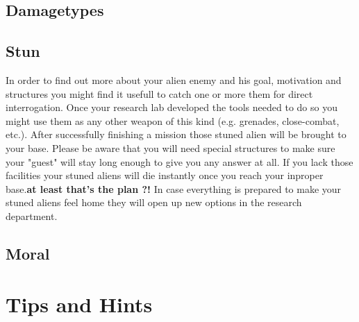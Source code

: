 \subsection{Damagetypes}

\subsection{Stun}
In order to find out more about your alien enemy and his goal, motivation and structures you might find it usefull to catch one or more them for direct interrogation. Once your research lab developed the tools needed to do so you might use them as any other weapon of this kind (e.g. grenades, close-combat, etc.). After successfully finishing a mission those stuned alien will be brought to your base. Please be aware that you will need special structures to make sure your "guest" will stay long enough to give you any answer at all. If you lack those facilities your stuned aliens will die instantly once you reach your inproper base.\textbf{at least that's the plan ?!} In case everything is prepared to make your stuned aliens feel home they will open up new options in the research department.

\subsection{Moral}

\section{Tips and Hints}
